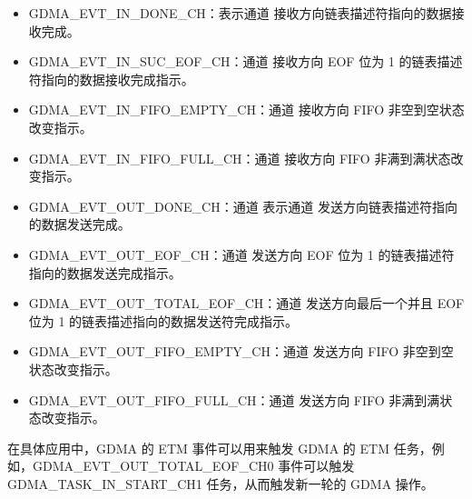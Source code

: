 \documentclass[main\_\_CN.tex]{subfiles}
\begin{document}
\begin{itemize}
\item GDMA\_EVT\_IN\_DONE\_CH：表示通道  接收方向链表描述符指向的数据接收完成。
\item GDMA\_EVT\_IN\_SUC\_EOF\_CH：通道  接收方向 EOF 位为 1 的链表描述符指向的数据接收完成指示。
\item GDMA\_EVT\_IN\_FIFO\_EMPTY\_CH：通道  接收方向 FIFO 非空到空状态改变指示。
\item GDMA\_EVT\_IN\_FIFO\_FULL\_CH：通道  接收方向 FIFO 非满到满状态改变指示。
\item GDMA\_EVT\_OUT\_DONE\_CH：通道  表示通道  发送方向链表描述符指向的数据发送完成。
\item GDMA\_EVT\_OUT\_EOF\_CH：通道  发送方向 EOF 位为 1 的链表描述符指向的数据发送完成指示。
\item GDMA\_EVT\_OUT\_TOTAL\_EOF\_CH：通道  发送方向最后一个并且 EOF 位为 1 的链表描述指向的数据发送符完成指示。
\item GDMA\_EVT\_OUT\_FIFO\_EMPTY\_CH：通道  发送方向 FIFO 非空到空状态改变指示。
\item GDMA\_EVT\_OUT\_FIFO\_FULL\_CH：通道  发送方向 FIFO 非满到满状态改变指示。
\end{itemize}

在具体应用中，GDMA 的 ETM 事件可以用来触发 GDMA 的 ETM 任务，例如，GDMA\_EVT\_OUT\_TOTAL\_EOF\_CH0 事件可以触发 GDMA\_TASK\_IN\_START\_CH1 任务，从而触发新一轮的 GDMA 操作。
\end{document}
